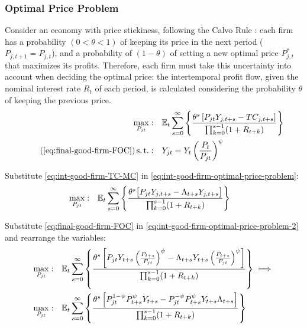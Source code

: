 \documentclass[
	thesis.tex
	]{subfiles}
\begin{document}
\subsubsection*{Optimal Price Problem}

Consider an economy with price stickiness, following the Calvo Rule \cite{calvo_staggered_1983}: each firm has a probability $(0 < \theta < 1)$ of keeping its price in the next period ($P_{j,t+1} = P_{j,t}$), and a probability of $(1 - \theta)$ of setting a new optimal price $P_{j,t}^\ast$ that maximizes its profits. Therefore, each firm must take this uncertainty into account when deciding the optimal price: the intertemporal profit flow, given the nominal interest rate $R_t$ of each period, is calculated considering the probability $\theta$ of keeping the previous price.
\begin{align}
	\label{eq:int-good-firm-optimal-price-problem}
	\max_{P_{jt}}: & \quad \E \sum_{s=0}^{\infty} \left\{ \frac{ \theta^s \left[ P_{jt} Y_{j,t+s} - TC_{j,t+s} \right] }{\prod_{k=0}^{s-1}(1+R_{t+k})} \right\} \\
	\tag{\ref{eq:final-good-firm-FOC}}
	\st: & \quad Y_{jt} = Y_t \left( \frac{P_t}{P_{jt}} \right)^{\psi}
\end{align}


Substitute \ref{eq:int-good-firm-TC-MC} in \ref{eq:int-good-firm-optimal-price-problem}:
\begin{align}
	\label{eq:int-good-firm-optimal-price-problem-2}
	\max_{P_{jt}}: & \quad {\mathbb{E}_{t}} \sum_{s=0}^{\infty} \left\{ \frac{\theta^s \big[ P_{jt} Y_{j,t+s} - \Lambda_{t+s} Y_{j,t+s} \big]}{\prod_{k=0}^{s-1}(1+R_{t+k})} \right\}
\end{align}

Substitute \ref{eq:final-good-firm-FOC} in \ref{eq:int-good-firm-optimal-price-problem-2} and rearrange the variables:
\begin{align}
	\max_{P_{jt}}: & \quad {\mathbb{E}_{t}} \sum_{s=0}^{\infty} \left\{ \frac{\theta^s \left[ P_{jt} Y_{t+s} \left( \frac{P_{t+s}}{P_{jt}} \right)^{\psi} - \Lambda_{t+s} Y_{t+s} \left( \frac{P_{t+s}}{P_{jt}} \right)^{\psi} \right] }{\prod_{k=0}^{s-1}(1+R_{t+k})} \right\} \implies \nonumber 
	\\
	\max_{P_{jt}}: & \quad {\mathbb{E}_{t}} \sum_{s=0}^{\infty} \left\{ \frac{\theta^s \left[ P_{jt}^{1-\psi} P_{t+s}^{\psi} Y_{t+s} - P_{jt}^{-\psi} P_{t+s}^{\psi} Y_{t+s} \Lambda_{t+s} \right] }{\prod_{k=0}^{s-1}(1+R_{t+k})} \right\} \nonumber
\end{align}
\end{document}
